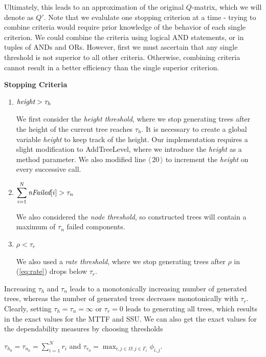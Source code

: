 \documentclass[12pt]{article}
\newcommand{\changed}[1]{#1}
\newcommand{\changed}[1]{\textcolor{red}{#1}}
\newcommand{\varName}[1]{\textrm{\it#1}}
\newcommand{\citeLine}[1]{$\langle \, #1 \, \rangle$}
\begin{document}
Ultimately, this leads to an approximation of the original $Q$-matrix, which we will denote as $Q'$. Note that we evalulate one stopping criterion at a time - trying to combine criteria would require prior knowledge of the behavior of each single criterion.  We could combine the criteria using logical AND statements, or in tuples of ANDs and ORs.  However, first we must ascertain that any single threshold is not superior to all other criteria.   Otherwise, combining criteria cannot result in a better efficiency than the single superior criterion.

\vspace{1em}
\noindent\textbf{Stopping Criteria}
\begin{enumerate}
\item $\varName{height} > \tau_h$

We first consider the \textit{height threshold}, where we stop generating
trees after the height of the current tree reaches $\tau_h$. It is necessary
to create a global variable \varName{height} to keep track of the height.  Our
implementation requires a slight modification to \mbox{AddTreeLevel}, where we
introduce the \varName{height} as a method parameter. We also modified line
\citeLine{20} to increment the \varName{height} on every successive call.

\item $\displaystyle\sum_{i=1}^N \varName{nFailed}[i] > \tau_n$

We also considered the  \textit{node threshold}, so constructed trees will
contain a maximum of $\tau_n$ failed components.

\item $\rho < \tau_r$

We also used a \textit{rate threshold}, where we stop generating trees after
$\rho$ \changed{in (\ref{eq:rate})} drops below $\tau_r$.
\end{enumerate}


Increasing $\tau_h$ and $\tau_n$ leads to a monotonically increasing number of
generated trees, whereas the number of generated trees decreases monotonically
\changed{with} $\tau_r$. Clearly, setting $\tau_h = \tau_n = \infty$ or $\tau_r = 0$ leads
to generating all trees, which results in the exact values for the MTTF and
SSU.  We can also get the exact values for the dependability measures by
choosing thresholds

$\tau_{h_0} = \tau_{n_0} = \displaystyle\sum_{i=1}^N r_i$ and $\tau_{r_0} = 
\max_{i,j \in \Omega : j \in \Gamma_i} \phi_{i,j}$.
\end{document}
